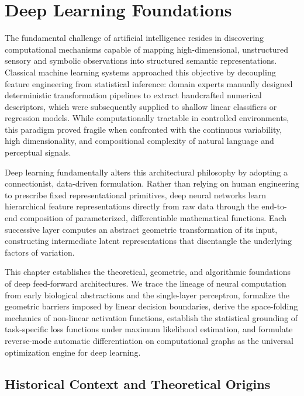 \documentclass[../../main.tex]{subfiles}
\begin{document}
\chapter{Deep Learning Foundations}
\label{ch:deep_learning_foundations}

The fundamental challenge of artificial intelligence resides in discovering computational mechanisms capable of mapping high-dimensional, unstructured sensory and symbolic observations into structured semantic representations. Classical machine learning systems approached this objective by decoupling feature engineering from statistical inference: domain experts manually designed deterministic transformation pipelines to extract handcrafted numerical descriptors, which were subsequently supplied to shallow linear classifiers or regression models. While computationally tractable in controlled environments, this paradigm proved fragile when confronted with the continuous variability, high dimensionality, and compositional complexity of natural language and perceptual signals.

Deep learning fundamentally alters this architectural philosophy by adopting a connectionist, data-driven formulation. Rather than relying on human engineering to prescribe fixed representational primitives, deep neural networks learn hierarchical feature representations directly from raw data through the end-to-end composition of parameterized, differentiable mathematical functions. Each successive layer computes an abstract geometric transformation of its input, constructing intermediate latent representations that disentangle the underlying factors of variation.

This chapter establishes the theoretical, geometric, and algorithmic foundations of deep feed-forward architectures. We trace the lineage of neural computation from early biological abstractions and the single-layer perceptron, formalize the geometric barriers imposed by linear decision boundaries, derive the space-folding mechanics of non-linear activation functions, establish the statistical grounding of task-specific loss functions under maximum likelihood estimation, and formulate reverse-mode automatic differentiation on computational graphs as the universal optimization engine for deep learning.

\clearpage
\section{Historical Context and Theoretical Origins}
\label{sec:dl_historical_motivation}
\end{document}
